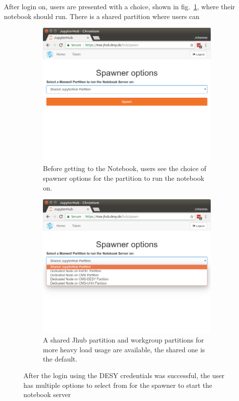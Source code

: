 \documentclass[10pt]{scrartcl}
\begin{document}
After login on, users are presented with a choice, shown in fig.~\ref{fig:jhub_spawn}, where their notebook should run.
There is a shared partition where users can

\begin{figure}
  \centering
    \begin{subfigure}{0.45\textwidth} %
	  \includegraphics[width=\textwidth]{figures/jhub004.png}
	  \caption{Before getting to the Notebook, users see the choice of spawner options for the partition to run the notebook on.} %
  \end{subfigure}
  \vspace{1em} %
  \begin{subfigure}{0.45\textwidth} %
	  \includegraphics[width=\textwidth]{figures/jhub005.png}
	  \caption{A shared Jhub partition and workgroup partitions for more heavy load usage are available, the shared one is the default.} %
  \end{subfigure}
  \caption{After the login using the DESY credentials was successful, the user has multiple options to select from for the spawner to start the notebook server}
  \label{fig:jhub_spawn}
\end{figure}
\end{document}
